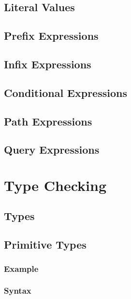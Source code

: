 \documentclass[a4paper,oneside,12pt, extrafontsizes]{memoir}
\begin{document}
\chapter{Literal Values}
\label{ch:literals}

\chapter{Prefix Expressions}
\label{ch:prefix}

\chapter{Infix Expressions}
\label{ch:infix}

\chapter{Conditional Expressions}
\label{ch:conditionals}

\chapter{Path Expressions}
\label{ch:paths}

\chapter{Query Expressions}
\label{ch:queries}

\part{Type Checking}

\chapter{Types}

\chapter{Primitive Types}
\label{ch:primitive-types}


\section{Example}


\section{Syntax}

\end{document}
